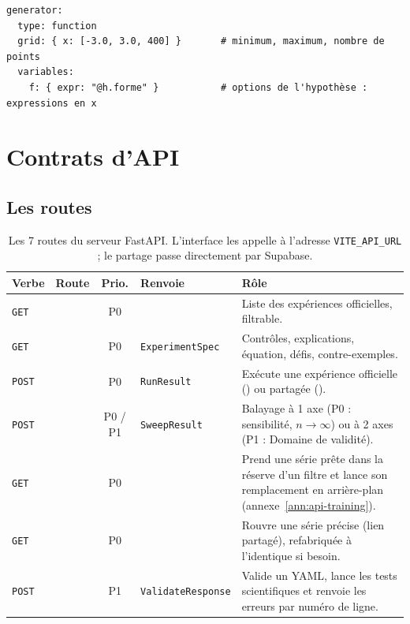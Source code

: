 \documentclass[11pt,a4paper]{article}
\begin{document}
\begin{appendices}
\begin{lstlisting}[caption={Extrait du générateur \texttt{function}.}]
generator:
  type: function
  grid: { x: [-3.0, 3.0, 400] }       # minimum, maximum, nombre de points
  variables:
    f: { expr: "@h.forme" }           # options de l'hypothèse : expressions en x
\end{lstlisting}


\newpage
\section{Contrats d'API}\label{ann:api}

\subsection{Les routes}
\begin{table}[H]
  \centering
  \footnotesize
  \begin{tabularx}{\textwidth}{@{}l l c l Y@{}}
    \toprule
    \textbf{Verbe} & \textbf{Route} & \textbf{Prio.} & \textbf{Renvoie} & \textbf{Rôle} \\
    \midrule
    \texttt{GET}  &         & P0 &  & Liste des expériences officielles, filtrable. \\
    \texttt{GET}  &    & P0 & \texttt{ExperimentSpec}    & Contrôles, explications, équation, défis, contre-exemples. \\
    \texttt{POST} &                 & P0 & \texttt{RunResult}         & Exécute une expérience officielle () ou partagée (). \\
    \texttt{POST} &               & P0 / P1 & \texttt{SweepResult}  & Balayage à 1 axe (P0 : sensibilité, $n \to \infty$) ou à 2 axes (P1 : Domaine de validité). \\
    \texttt{GET}  &       & P0 &  & Prend une série prête dans la réserve d'un filtre et lance son remplacement en arrière-plan (annexe~\ref{ann:api-training}). \\
    \texttt{GET}  &    & P0 &  & Rouvre une série précise (lien partagé), refabriquée à l'identique si besoin. \\
    \texttt{POST} &            & P1 & \texttt{ValidateResponse}  & Valide un YAML, lance les tests scientifiques et renvoie les erreurs par numéro de ligne. \\
    \bottomrule
  \end{tabularx}
  \caption{Les 7 routes du serveur FastAPI. L'interface les appelle à l'adresse \texttt{VITE\_API\_URL} ; le partage passe directement par Supabase.}
\end{table}


\end{appendices}
\end{document}
